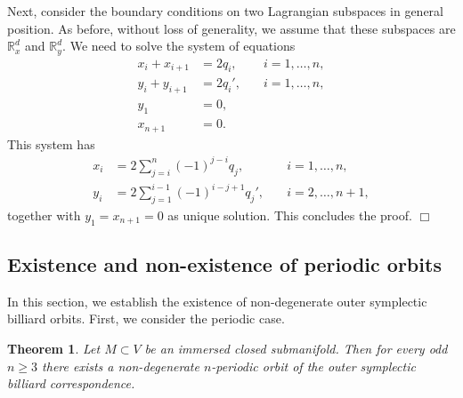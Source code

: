 \documentclass[12pt]{article}
\newtheorem{theorem}{Theorem}
\newcommand{\proofend}{$\Box$\bigskip}
\newcommand{\R}{{\mathbb R}}
\begin{document}
Next, consider the boundary conditions on two Lagrangian subspaces in general position. As before, without loss of generality, we assume that these subspaces are $\R^d_x$ and $\R^d_y$. We need to solve the system of equations
\begin{equation}\nonumber
\begin{aligned}
x_i + x_{i+1}&=2q_i, \quad &i=1,\ldots,n,\\ 
y_i+y_{i+1}&=2q_i', \quad &i=1,\ldots,n,\\[.5ex]
y_1&=0,\\ 
x_{n+1}&=0.
\end{aligned}
\end{equation}
This system has 
\begin{equation}\nonumber
\begin{aligned}
x_i&=2\sum_{j=i}^n (-1)^{j-i} q_j,\quad &i=1,\ldots,n,\\[.5ex]
y_i&= 2 \sum_{j=1}^{i-1} (-1)^{i-j+1} q_j',\quad &i=2,\ldots,n+1,
\end{aligned}
\end{equation}
together with $y_1=x_{n+1}=0$ as unique solution. This concludes the proof.
\proofend

\subsection{Existence and non-existence of periodic orbits} \label{subsect:exist}


In this section, we establish the existence of non-degenerate outer symplectic billiard orbits. First, we consider the periodic case.

\begin{theorem} \label{thm:existper}
Let $M\subset V$ be an immersed closed submanifold. %
Then for every odd $n\geq3$ there exists a non-degenerate $n$-periodic orbit of the outer symplectic billiard correspondence.
\end{theorem}
\end{document}
